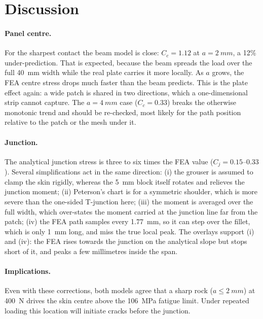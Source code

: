 \documentclass[11pt,a4paper]{article}
\begin{document}
\section{Discussion}

\paragraph{Panel centre.}
For the sharpest contact the beam model is close: $C_c = 1.12$ at $a = \SI{2}{mm}$, a 12\% under-prediction. That is expected, because the beam spreads the load over the full \SI{40}{mm} width while the real plate carries it more locally. As $a$ grows, the FEA centre stress drops much faster than the beam predicts. This is the plate effect again: a wide patch is shared in two directions, which a one-dimensional strip cannot capture. The $a = \SI{4}{mm}$ case ($C_c = 0.33$) breaks the otherwise monotonic trend and should be re-checked, most likely for the path position relative to the patch or the mesh under it.

\paragraph{Junction.}
The analytical junction stress is three to six times the FEA value ($C_j = 0.15$--$0.33$). Several simplifications act in the same direction:
(i) the grouser is assumed to clamp the skin rigidly, whereas the \SI{5}{mm} block itself rotates and relieves the junction moment;
(ii) Peterson's chart is for a symmetric shoulder, which is more severe than the one-sided T-junction here;
(iii) the moment is averaged over the full width, which over-states the moment carried at the junction line far from the patch;
(iv) the FEA path samples every \SI{1.77}{mm}, so it can step over the fillet, which is only \SI{1}{mm} long, and miss the true local peak.
The overlays support (i) and (iv): the FEA rises towards the junction on the analytical slope but stops short of it, and peaks a few millimetres inside the span.

\paragraph{Implications.}
Even with these corrections, both models agree that a sharp rock ($a \le \SI{2}{mm}$) at \SI{400}{N} drives the skin centre above the \SI{106}{MPa} fatigue limit. Under repeated loading this location will initiate cracks before the junction.
\end{document}
